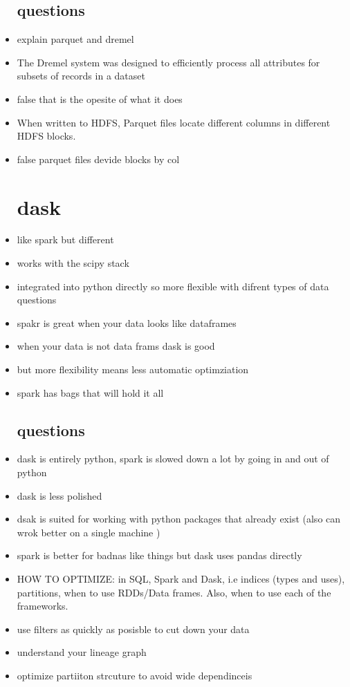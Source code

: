 \documentclass{article}
\begin{document}
\begin{itemize}
\subsection*{questions}
\item explain parquet and dremel 
\item The Dremel system was designed to efficiently process all attributes for subsets of
records in a dataset
\item false that is the opesite of what it does 
\item When written to HDFS, Parquet files locate different columns in different HDFS blocks.
\item false parquet files devide  blocks by col
\section*{dask }
\item like spark but different
\item works with the scipy stack 
\item integrated into python directly so more flexible with difrent types of data questions 
\item spakr is great when your data looks like dataframes 
\item when your data is not data frams dask is good
\item but more flexibility means less automatic optimziation 
\item spark has bags that will hold it all
\subsection*{questions}
\item dask is entirely python, spark is slowed down a lot by going in and out of python 
\item dask is less polished 
\item dsak is suited for working with python packages that already exist (also can wrok better on a single machine )
\item spark is better for badnas like things but dask uses pandas directly
\item HOW TO OPTIMIZE: in SQL, Spark and Dask, i.e indices (types and uses), partitions, when to use
RDDs/Data frames. Also, when to use each of the frameworks.
\item use filters as quickly as posisble to cut down your data 
\item understand your lineage graph 
\item optimize partiiton strcuture to avoid wide dependinceis

\end{itemize}
\end{document}
